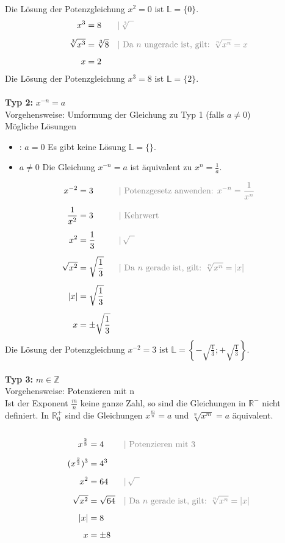 \documentclass[a4paper,10pt]{article}
\begin{document}
\begin{multicols}{3}
    Die Lösung der Potenzgleichung $x^2 = 0$ ist $\mathbb{L} = \{0\}$.
    \begin{align*} x^3 &= 8 &&{\color{gray}|\, \sqrt[3]{\phantom{x}}} \\[5px] \sqrt[3]{x^3} &= \sqrt[3]{8} &&{\color{gray}| \text{ Da $n$ ungerade ist, gilt: } \sqrt[n]{x^n} = x} \\[5px] x &= 2 \end{align*}
    Die Lösung der Potenzgleichung $x^3 = 8$ ist $\mathbb{L} = \{2\}$.\\~\\
    \textbf{Typ 2:} $x^{-n} = a$\\
    Vorgehensweise: Umformung der Gleichung zu Typ 1 (falls $a \neq 0$)\\
    Mögliche Lösungen
    \begin{itemize}
        \item : $a = 0$ Es gibt keine Lösung $\mathbb{L} = \{\}$.
        \item  $a \neq 0$ Die Gleichung $x^{-n} = a$ ist äquivalent zu $x^n = \frac{1}{a}$.
    \end{itemize}
    \begin{align*} x^{-2} &= 3 &&{\color{gray}| \text{ Potenzgesetz anwenden: } x^{-n} = \frac{1}{x^n}} \\[5px] \frac{1}{x^2} &= 3 &&{\color{gray}| \text{ Kehrwert}} \\[5px] x^2 &= \frac{1}{3} &&{\color{gray}|\, \sqrt{\phantom{x}}} \\[5px] \sqrt{x^2} &= \sqrt{\frac{1}{3}} &&{\color{gray}| \text{ Da $n$ gerade ist, gilt: } \sqrt[n]{x^n} = |x|} \\[5px] |x| &= \sqrt{\frac{1}{3}} \\[5px] x &= \pm \sqrt{\frac{1}{3}} \end{align*}
    Die Lösung der Potenzgleichung $x^{-2} = 3$ ist $\mathbb{L} = \left\{-\sqrt{\frac{1}{3}};+\sqrt{\frac{1}{3}}\right\}$.\\~\\
    \textbf{Typ 3:} $m \in \mathbb{Z}$ \\
    Vorgehensweise: Potenzieren mit n\\
    Ist der Exponent $\frac{m}{n}$ keine ganze Zahl, so sind die Gleichungen in $\mathbb{R}^{-}$ nicht definiert. In $\mathbb{R}_{0}^{+}$ sind die Gleichungen $x^{\frac{m}{n}} = a$ und $\sqrt[n]{x^m} = a$ äquivalent.\\~\\
    \begin{align*} x^{\frac{2}{3}} &= 4 &&{\color{gray}| \text{ Potenzieren mit 3}} \\[5px] (x^{\frac{2}{3}})^3 &= 4^3 \\[5px] x^2 &= 64 &&{\color{gray}|\, \sqrt{\phantom{x}}} \\[5px] \sqrt{x^2} &= \sqrt{64} &&{\color{gray}| \text{ Da $n$ gerade ist, gilt: } \sqrt[n]{x^n} = |x|} \\[5px] |x| &= 8 \\[5px] x &= \pm 8 \end{align*}

\end{multicols}
\end{document}

